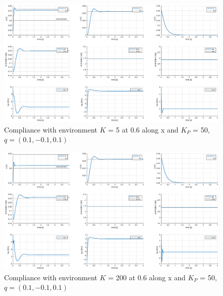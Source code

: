 \documentclass[a4paper,12pt]{article}
\begin{document}
\begin{figure}[H]
    \begin{center}
        \hspace*{-4.5cm}
        \includegraphics[scale=0.5]{images/compliance_soft.eps}
    \end{center}
    \caption{Compliance with environment $K$ = 5 at 0.6 along x and $K_P$ = 50, $q = (0.1,-0.1,0.1)$}
    \label{fig:compliance_soft}
\end{figure}

\begin{figure}[H]
    \begin{center}
        \hspace*{-4.5cm}
        \includegraphics[scale=0.5]{images/compliance_stiff.eps}
    \end{center}
    \caption{Compliance with environment $K$ = 200 at 0.6 along x and $K_P$ = 50, $q = (0.1,-0.1,0.1)$}
    \label{fig:compliance_stiff}
\end{figure}
\end{document}
